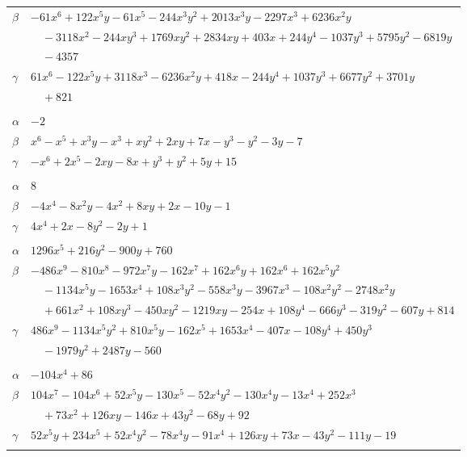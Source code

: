 \documentclass[11pt]{article}
\begin{document}
\begin{longtable}{@{}ll@{}}
$\beta$ & $-61x^{6}+122x^{5}y-61x^{5}-244x^{3}y^{2}+2013x^{3}y-2297x^{3}+6236x^{2}y$\\
 & $\quad -3118x^{2}-244xy^{3}+1769xy^{2}+2834xy+403x+244y^{4}-1037y^{3}+5795y^{2}-6819y$\\
 & $\quad -4357$\\
$\gamma$ & $61x^{6}-122x^{5}y+3118x^{3}-6236x^{2}y+418x-244y^{4}+1037y^{3}+6677y^{2}+3701y$\\
 & $\quad +821$\\
\addlinespace[3pt]
\multicolumn{2}{@{}l}{$\{i,j\}=\{23,34\}$, $k_{ij}=2\cdot 7$}\\
$\alpha$ & $-2$\\
$\beta$ & $x^{6}-x^{5}+x^{3}y-x^{3}+xy^{2}+2xy+7x-y^{3}-y^{2}-3y-7$\\
$\gamma$ & $-x^{6}+2x^{5}-2xy-8x+y^{3}+y^{2}+5y+15$\\
\addlinespace[3pt]
\multicolumn{2}{@{}l}{$\{i,j\}=\{25,26\}$, $k_{ij}=3\cdot 11$}\\
$\alpha$ & $8$\\
$\beta$ & $-4x^{4}-8x^{2}y-4x^{2}+8xy+2x-10y-1$\\
$\gamma$ & $4x^{4}+2x-8y^{2}-2y+1$\\
\addlinespace[3pt]
\multicolumn{2}{@{}l}{$\{i,j\}=\{25,28\}$, $k_{ij}=2^{7}\cdot 3\cdot 5$}\\
$\alpha$ & $1296x^{5}+216y^{2}-900y+760$\\
$\beta$ & $-486x^{9}-810x^{8}-972x^{7}y-162x^{7}+162x^{6}y+162x^{6}+162x^{5}y^{2}$\\
 & $\quad -1134x^{5}y-1653x^{4}+108x^{3}y^{2}-558x^{3}y-3967x^{3}-108x^{2}y^{2}-2748x^{2}y$\\
 & $\quad +661x^{2}+108xy^{3}-450xy^{2}-1219xy-254x+108y^{4}-666y^{3}-319y^{2}-607y+814$\\
$\gamma$ & $486x^{9}-1134x^{5}y^{2}+810x^{5}y-162x^{5}+1653x^{4}-407x-108y^{4}+450y^{3}$\\
 & $\quad -1979y^{2}+2487y-560$\\
\addlinespace[3pt]
\multicolumn{2}{@{}l}{$\{i,j\}=\{25,29\}$, $k_{ij}=3\cdot 11^{2}$}\\
$\alpha$ & $-104x^{4}+86$\\
$\beta$ & $104x^{7}-104x^{6}+52x^{5}y-130x^{5}-52x^{4}y^{2}-130x^{4}y-13x^{4}+252x^{3}$\\
 & $\quad +73x^{2}+126xy-146x+43y^{2}-68y+92$\\
$\gamma$ & $52x^{5}y+234x^{5}+52x^{4}y^{2}-78x^{4}y-91x^{4}+126xy+73x-43y^{2}-111y-19$\\
\addlinespace[3pt]

\end{longtable}
\end{document}

